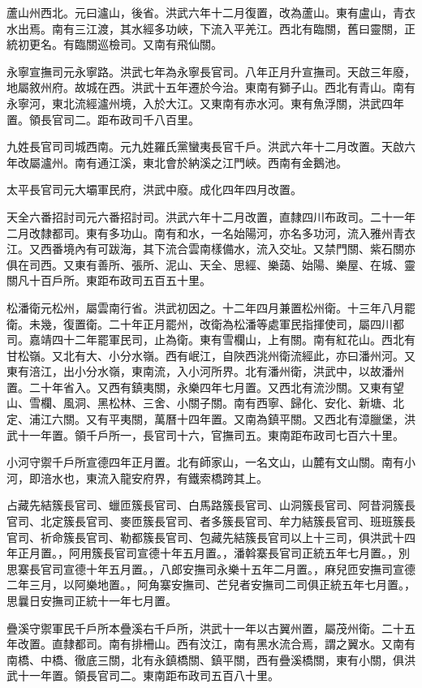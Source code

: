 蘆山州西北。元曰瀘山，後省。洪武六年十二月復置，改為蘆山。東有盧山，青衣水出焉。南有三江渡，其水經多功峽，下流入平羌江。西北有臨關，舊曰靈關，正統初更名。有臨關巡檢司。又南有飛仙關。

永寧宣撫司元永寧路。洪武七年為永寧長官司。八年正月升宣撫司。天啟三年廢，地屬敘州府。故城在西。洪武十五年遷於今治。東南有獅子山。西北有青山。南有永寧河，東北流經瀘州境，入於大江。又東南有赤水河。東有魚浮關，洪武四年置。領長官司二。距布政司千八百里。

九姓長官司司城西南。元九姓羅氏黨蠻夷長官千戶。洪武六年十二月改置。天啟六年改屬瀘州。南有通江溪，東北會於納溪之江門峽。西南有金鵝池。

太平長官司元大壩軍民府，洪武中廢。成化四年四月改置。

天全六番招討司元六番招討司。洪武六年十二月改置，直隸四川布政司。二十一年二月改隸都司。東有多功山。南有和水，一名始陽河，亦名多功河，流入雅州青衣江。又西番境內有可跋海，其下流合雲南樣備水，流入交址。又禁門關、紫石關亦俱在司西。又東有善所、張所、泥山、天全、思經、樂藹、始陽、樂屋、在城、靈關凡十百戶所。東距布政司五百五十里。

松潘衛元松州，屬雲南行省。洪武初因之。十二年四月兼置松州衛。十三年八月罷衛。未幾，復置衛。二十年正月罷州，改衛為松潘等處軍民指揮使司，屬四川都司。嘉靖四十二年罷軍民司，止為衛。東有雪欄山，上有關。南有紅花山。西北有甘松嶺。又北有大、小分水嶺。西有岷江，自陜西洮州衛流經此，亦曰潘州河。又東有涪江，出小分水嶺，東南流，入小河所界。北有潘州衛，洪武中，以故潘州置。二十年省入。又西有鎮夷關，永樂四年七月置。又西北有流沙關。又東有望山、雪欄、風洞、黑松林、三舍、小關子關。南有西寧、歸化、安化、新塘、北定、浦江六關。又有平夷關，萬曆十四年置。又南為鎮平關。又西北有漳臘堡，洪武十一年置。領千戶所一，長官司十六，官撫司五。東南距布政司七百六十里。

小河守禦千戶所宣德四年正月置。北有師家山，一名文山，山麓有文山關。南有小河，即涪水也，東流入龍安府界，有鐵索橋跨其上。

占藏先結簇長官司、蠟匝簇長官司、白馬路簇長官司、山洞簇長官司、阿昔洞簇長官司、北定簇長官司、麥匝簇長官司、者多簇長官司、牟力結簇長官司、班班簇長官司、祈命簇長官司、勒都簇長官司、包藏先結簇長官司以上十三司，俱洪武十四年正月置。，阿用簇長官司宣德十年五月置。，潘斡寨長官司正統五年七月置。，別思寨長官司宣德十年五月置。，八郎安撫司永樂十五年二月置。，麻兒匝安撫司宣德二年三月，以阿樂地置。，阿角寨安撫司、芒兒者安撫司二司俱正統五年七月置。，思曩日安撫司正統十一年七月置。

疊溪守禦軍民千戶所本疊溪右千戶所，洪武十一年以古翼州置，屬茂州衛。二十五年改置。直隸都司。南有排柵山。西有汶江，南有黑水流合焉，謂之翼水。又南有南橋、中橋、徹底三關，北有永鎮橋關、鎮平關，西有疊溪橋關，東有小關，俱洪武十一年置。領長官司二。東南距布政司五百八十里。

